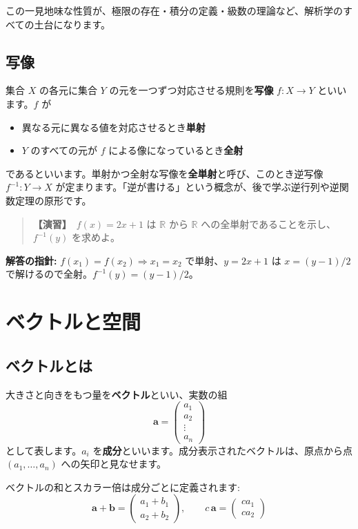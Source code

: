 \documentclass{article}
\begin{document}
この一見地味な性質が、極限の存在・積分の定義・級数の理論など、解析学のすべての土台になります。

\subsection{写像}

集合 \(X\) の各元に集合 \(Y\) の元を一つずつ対応させる規則を\textbf{写像} \(f : X \to Y\) といいます。\(f\) が
\begin{itemize}
\item 異なる元に異なる値を対応させるとき\textbf{単射}
\item \(Y\) のすべての元が \(f\) による像になっているとき\textbf{全射}
\end{itemize}
であるといいます。単射かつ全射な写像を\textbf{全単射}と呼び、このとき逆写像 \(f^{-1} : Y \to X\) が定まります。「逆が書ける」という概念が、後で学ぶ逆行列や逆関数定理の原形です。

\begin{quote}
\textbf{【演習】}\ \(f(x) = 2x + 1\) は \(\mathbb{R}\) から \(\mathbb{R}\) への全単射であることを示し、\(f^{-1}(y)\) を求めよ。
\end{quote}

\textbf{解答の指針:} \(f(x_1) = f(x_2) \Rightarrow x_1 = x_2\) で単射、\(y = 2x+1\) は \(x = (y-1)/2\) で解けるので全射。\(f^{-1}(y) = (y-1)/2\)。

\section{ベクトルと空間}

\subsection{ベクトルとは}

大きさと向きをもつ量を\textbf{ベクトル}といい、実数の組
\[ \boldsymbol{a} = \begin{pmatrix} a_1 \\ a_2 \\ \vdots \\ a_n \end{pmatrix} \]
として表します。\(a_i\) を\textbf{成分}といいます。成分表示されたベクトルは、原点から点 \((a_1, \dots, a_n)\) への矢印と見なせます。

ベクトルの和とスカラー倍は成分ごとに定義されます:
\[ \boldsymbol{a} + \boldsymbol{b} = \begin{pmatrix} a_1 + b_1 \\ a_2 + b_2 \end{pmatrix}, \qquad c\,\boldsymbol{a} = \begin{pmatrix} c a_1 \\ c a_2 \end{pmatrix} \]
\end{document}
